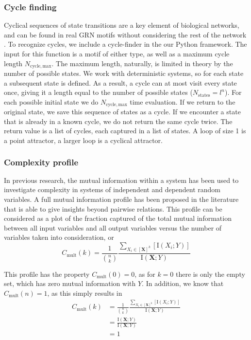 \documentclass[../main.tex]{subfiles}
\begin{document}
\subsubsection{Cycle finding}

Cyclical sequences of state transitions are a key element of biological networks, and can be found in real GRN motifs without considering the rest of the network \cite{burda2011motifs}.
To recognize cycles, we include a cycle-finder in the our Python framework.
The input for this function is a motif of either type, as well as a maximum cycle length $N_\mathrm{cycle,max}$.
The maximum length, naturally, is limited in theory by the number of possible states.
We work with deterministic systems, so for each state a subsequent state is defined.
As a result, a cycle can at most visit every state once, giving it a length equal to the number of possible states ($N_\mathrm{states} = l^n$).
For each possible initial state we do $N_\mathrm{cycle,max}$ time evaluation.
If we return to the original state, we save this sequence of states as a cycle.
If we encounter a state that is already in a known cycle, we do not return the same cycle twice.
The return value is a list of cycles, each captured in a list of states.
A loop of size 1 is a point attractor, a larger loop is a cyclical attractor.

\subsubsection{Complexity profile}

In previous research, the mutual information within a system has been used to investigate complexity in systems of independent and dependent random variables.
A full mutual information profile has been proposed in the literature that is able to give insights beyond pairwise relations.
This profile can be considered as a plot of the fraction captured of the total mutual information between all input variables and all output variables versus the number of variables taken into consideration, or
%
\begin{equation}
C_\mathrm{mult}(k) = \frac{1}{\binom{n}{k}}\frac{\sum_{X_i \in [\mathbf{X}]^k} [\mathrm{I}\left( X_i;Y \right)]}{\mathrm{I}\left( \mathbf{X};Y\right)}
\end{equation}

This profile has the property $C_\mathrm{mult}\left( 0 \right) = 0$, as for $k = 0$ there is only the empty set, which has zero mutual information with $Y$.
In addition, we know that $C_\mathrm{mult}\left( n\right) = 1$, as this simply results in
%
\begin{align}
C_\mathrm{mult}\left( k \right) 
&= \frac{1}{\binom{n}{k}}\frac{\sum_{X_i \in [\mathbf{X}]^k} [\mathrm{I}\left( X_i;Y\right)]}{\mathrm{I}\left( \mathbf{X};Y\right)} \\
&= \frac{\mathrm{I}\left( \mathbf{X};Y\right)}{\mathrm{I}\left( \mathbf{X};Y\right)} \\
&= 1
\end{align}
\end{document}
